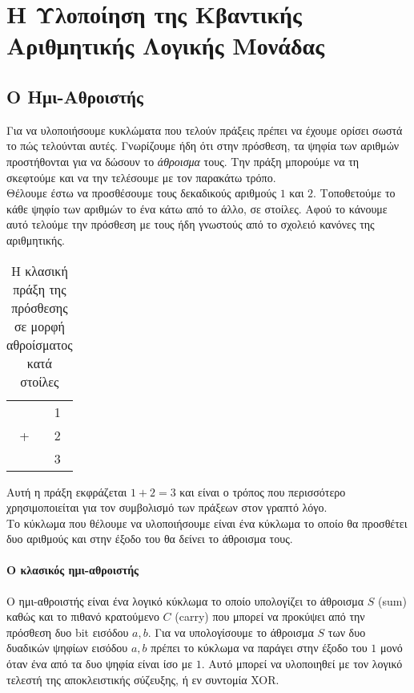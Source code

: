 \chapter{Η Υλοποίηση της Κβαντικής Αριθμητικής Λογικής Μονάδας}

\section{Ο Ημι-Αθροιστής}
Για να υλοποιήσουμε κυκλώματα που τελούν πράξεις πρέπει να έχουμε ορίσει σωστά
το πώς τελούνται αυτές. Γνωρίζουμε ήδη ότι στην πρόσθεση, τα ψηφία των αριθμών
προστήθονται για να δώσουν το \emph{άθροισμα} τους. Την πράξη μπορούμε να τη
σκεφτούμε και να την τελέσουμε με τον παρακάτω τρόπο.\\

Θέλουμε έστω να προσθέσουμε τους δεκαδικούς αριθμούς $1$ και $2$.
Τοποθετούμε το κάθε ψηφίο των αριθμών το ένα κάτω από το άλλο, σε στοίλες.
Αφού το κάνουμε αυτό τελούμε την πρόσθεση με τους ήδη γνωστούς από το σχολειό
κανόνες της αριθμητικής.

\begin{table}
    \centering
    \begin{tabular}{c@{\,}c}
        & 1 \\
      + & 2 \\
      \hline
        & 3 \\
    \end{tabular}
    \label{tab:simple_decimal_addition}
    \caption{Η κλασική πράξη της πρόσθεσης σε μορφή αθροίσματος κατά στοίλες}
\end{table}


Αυτή η πράξη εκφράζεται $1 + 2 = 3$ και είναι ο τρόπος που περισσότερο
χρησιμοποιείται για τον συμβολισμό των πράξεων στον γραπτό λόγο.\\

Το κύκλωμα που θέλουμε να υλοποιήσουμε είναι ένα κύκλωμα το οποίο θα
προσθέτει δυο αριθμούς και στην έξοδο του θα δείνει το άθροισμα τους.

\subsubsection{Ο κλασικός ημι-αθροιστής}
Ο ημι-αθροιστής είναι ένα λογικό κύκλωμα το οποίο υπολογίζει
το άθροισμα $S$ (sum) καθώς και το πιθανό κρατούμενο $C$ (carry)
που μπορεί να προκύψει από την πρόσθεση δυο bit εισόδου $a, b$.
Για να υπολογίσουμε το άθροισμα $S$ των δυο δυαδικών ψηφίων εισόδου $a, b$ πρέπει
το κύκλωμα να παράγει στην έξοδο του $1$ μονό όταν ένα από τα δυο ψηφία είναι
ίσο με $1$. Αυτό μπορεί να υλοποιηθεί με τον λογικό τελεστή της αποκλειστικής σύζευξης,
ή εν συντομία XOR.

